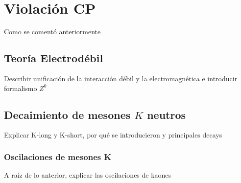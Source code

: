\chapter{Violación CP}\label{cap:CP_violation}

Como se comentó anteriormente

\section{Teoría Electrodébil}\label{sec:electroweak}
Describir unificación de la interacción débil y la electromagnética
e introducir formalismo $Z^0$
\section{Decaimiento de mesones $K$ neutros}
\label{sec:neutral_kaon_decay}

Explicar K-long y K-short, por qué se introducieron y principales decays

\subsection{Oscilaciones de mesones K}\label{sec:kaon_oscillations}

A raíz de lo anterior, explicar las oscilaciones de kaones